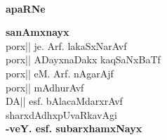 
~
\medskip

\vfill

\begin{center}
{\Large\bfseries apaRNe}
\end{center}
\bigskip

\begin{center}
{\bf sanAmxnayx}\\
porx|| je. Arf. lakaSxNarAvf\\[4pt]
porx|| ADayxnaDakx kaqSaNxBaTf\\[4pt]
porx|| eM. Arf. nAgarAjf\\[4pt]
porx|| mAdhurAvf\\[4pt]
DA|| esf. bAlacaMdarxrAvf\\[0.6cm]
sharxdAdhxpUvaRkavAgi\\
\hfill{\bf -veY. esf. subarxhamxNayx}                                                   
\end{center}

\vfill
\eject
